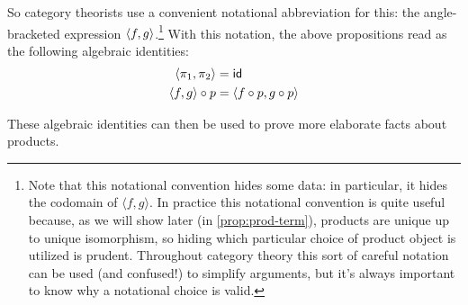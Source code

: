 So category theorists use a convenient notational abbreviation
for this: the angle-bracketed expression \(\langle f,g\rangle\).\footnote{Note that 
this notational convention hides some data: in particular, 
it hides the codomain of $\langle f, g \rangle$. In practice this notational convention is quite useful 
because, as we will show later (in \cref{prop:prod-term}), products are 
unique up to unique isomorphism, so hiding which particular choice of 
product object is utilized is prudent. Throughout category theory this 
sort of careful notation can be used (and confused!) to simplify arguments, but 
it's always important to know why a notational choice is valid.}
With this notation, the above propositions read as the following
algebraic identities:
\begin{align}
  \label{eq:id_eq_tupling}
  \langle \pi_1,\pi_2\rangle &= \mathsf{id} \\
  \langle f,g\rangle\circ p &= \langle f\circ p, g \circ p\rangle
\end{align}

These algebraic identities can then be used to prove more elaborate facts about
products.

